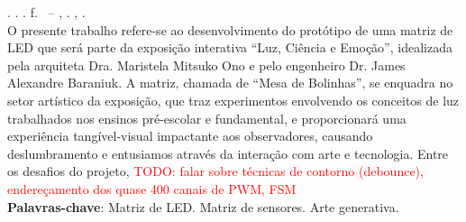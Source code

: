 
\begin{resumo}[RESUMO]
\begin{SingleSpacing}

\imprimirautorcitacao. \imprimirtitulo. \imprimirdata. \pageref {LastPage} f. \imprimirprojeto\ – \imprimirprograma, \imprimirinstituicao. \imprimirlocal, \imprimirdata.\\

O presente trabalho refere-se ao desenvolvimento do protótipo de uma matriz de LED que será parte da exposição interativa ``Luz, Ciência e Emoção'', idealizada pela arquiteta Dra. Maristela Mitsuko Ono e pelo engenheiro Dr. James Alexandre Baraniuk. A matriz, chamada de ``Mesa de Bolinhas'', se enquadra no setor artístico da exposição, que traz experimentos envolvendo os conceitos de luz trabalhados nos ensinos pré-escolar e fundamental, e proporcionará uma experiência tangível-visual impactante aos observadores, causando deslumbramento e entusiamos através da interação com arte e tecnologia.
Entre os desafios do projeto, \textcolor{red}{TODO: falar sobre técnicas de contorno (debounce), endereçamento dos quase 400 canais de PWM, FSM}\\

\textbf{Palavras-chave}: Matriz de LED. Matriz de sensores. Arte generativa.

\end{SingleSpacing}
\end{resumo}



